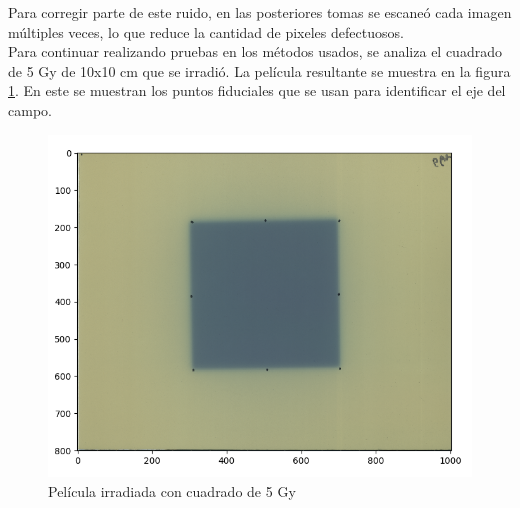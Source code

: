 Para corregir parte de este ruido, en las posteriores tomas se escaneó cada imagen múltiples veces, lo que reduce la cantidad de pixeles defectuosos.\\

Para continuar realizando pruebas en los métodos usados, se analiza el cuadrado de 5 Gy de 10x10 cm que se irradió. La película resultante se muestra en la figura \ref{fig:cuadrado5Gy}. En este se muestran los puntos fiduciales que se usan para identificar el eje del campo.\\

\begin{figure}[H]
	\centering
	\includegraphics[width=0.7\linewidth]{images/peliculaCuadrado.png}
	\caption{Película irradiada con cuadrado de 5 Gy }
	\label{fig:cuadrado5Gy}
\end{figure}

